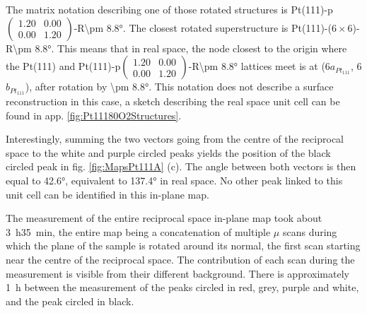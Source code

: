 The matrix notation describing one of those rotated structures is Pt(111)-p$\begin{pmatrix} 1.20 & 0.00\\ 0.00 & 1.20 \end{pmatrix}$-R\ang{\pm 8.8}.
The closest rotated superstructure is Pt(111)-($6\times6$)-R\ang{\pm 8.8}.
This means that in real space, the node closest to the origin where the Pt(111) and Pt(111)-p$\begin{pmatrix} 1.20 & 0.00\\ 0.00 & 1.20 \end{pmatrix}$-R\ang{\pm 8.8} lattices meet is at (6$a_{Pt_{111}}$, 6$b_{Pt_{111}}$), after rotation by \ang{\pm 8.8}.
This notation does not describe a surface reconstruction in this case, a sketch describing the real space unit cell can be found in app. \ref{fig:Pt11180O2Structures}.

Interestingly, summing the two vectors going from the centre of the reciprocal space to the white and purple circled peaks yields the position of the black circled peak in fig. \ref{fig:MapsPt111A} (c).
The angle between both vectors is then equal to \ang{42.6}, equivalent to \ang{137.4} in real space.
No other peak linked to this unit cell can be identified in this in-plane map.


The measurement of the entire reciprocal space in-plane map took about \qty{3}{\hour}\qty{35}{\minute}, the entire map being a concatenation of multiple $\mu$ scans during which the plane of the sample is rotated around its normal, the first scan starting near the centre of the reciprocal space.
The contribution of each scan during the measurement is visible from their different background.
There is approximately \qty{1}{\hour} between the measurement of the peaks circled in red, grey, purple and white, and the peak circled in black.

